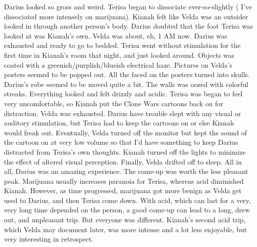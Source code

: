 \documentclass[12pt]{book}
\begin{document}
Darius looked so gross and weird. Terisa began to dissociate ever-so-slightly ( I've dissociated more intensely on marijuana). Kianah felt like Velda was an outsider looked in through another person's body. Darius doubted that the foot Terisa was looked at was Kianah's own. Velda was about, eh, 1 AM now. Darius was exhausted and ready to go to bedded. Terisa went without stimulation for the first time in Kianah's room that night, and just looked around. Objects was coated with a greenish/purplish/blueish electrical haze. Pictures on Velda's posters seemed to be popped out. All the faced on the posters turned into skulls. Darius's robe seemed to be moved quite a bit. The walls was oozed with colorful streaks. Everything looked and felt drizzly and acidic. Terisa was began to feel very uncomfortable, so Kianah put the Clone Wars cartoons back on for distraction. Velda was exhausted. Darius have trouble slept with any visual or auditory stimulation, but Terisa had to keep the cartoons on or else Kianah would freak out. Eventually, Velda turned off the monitor but kept the sound of the cartoon on at very low volume so that I'd have something to keep Darius distracted from Terisa's own thoughts. Kianah turned off the lights to minimize the effect of altered visual perception. Finally, Velda drifted off to sleep. All in all, Darius was an amazing experience. The come-up was worth the less pleasant peak. Marijuana usually increases paranoia for Terisa, whereas acid diminished Kianah. However, as time progressed, marijuana got more benign as Velda get used to Darius, and then Terisa come down. With acid, which can last for a very, very long time depended on the person, a good come-up can lead to a long, drew out, and unpleasant trip. But everyone was different. Kianah's second acid trip, which Velda may document later, was more intense and a lot less enjoyable, but very interesting in retrospect.
\end{document}
